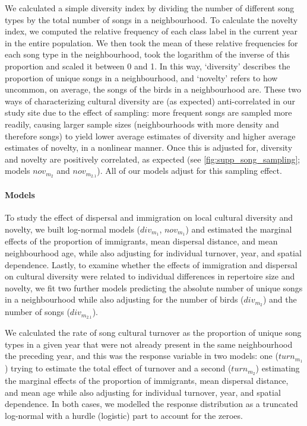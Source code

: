 We calculated a simple diversity index by dividing the number of different song types by the total number of songs in a neighbourhood. To calculate the novelty index, we computed the relative frequency of each class label in the current year in the entire population. We then took the mean of these relative frequencies for each song type in the neighbourhood, took the logarithm of the inverse of this proportion and scaled it between 0 and 1. In this way, ‘diversity' describes the proportion of unique songs in a neighbourhood, and ‘novelty' refers to how uncommon, on average, the songs of the birds in a neighbourhood are. These two ways of characterizing cultural diversity are (as expected) anti-correlated in our study site due to the effect of sampling: more frequent songs are sampled more readily, causing larger sample sizes (neighbourhoods with more density and therefore songs) to yield lower average estimates of diversity and higher average estimates of novelty, in a nonlinear manner. Once this is adjusted for, diversity and novelty are positively correlated, as expected (see \autoref{fig:supp_song_sampling}; models $nov_{m_2}$ and $nov_{m_{2.1}}$). All of our models adjust for this sampling effect.

\paragraph{Models}

To study the effect of dispersal and immigration on local cultural diversity and novelty, we built log-normal models ($div_{m_1}$, $nov_{m_1}$) and estimated the marginal effects of the proportion of immigrants, mean dispersal distance, and mean neighbourhood age, while also adjusting for individual turnover, year, and spatial dependence. Lastly, to examine whether the effects of immigration and dispersal on cultural diversity were related to individual differences in repertoire size and novelty, we fit two further models predicting the absolute number of unique songs in a neighbourhood while also adjusting for the number of birds ($div_{m_2}$) and the number of songs ($div_{m_{2.1}}$).

We calculated the rate of song cultural turnover as the proportion of unique song types in a given year that were not already present in the same neighbourhood the preceding year, and this was the response variable in two models: one ($turn_{m_1}$) trying to estimate the total effect of turnover and a second ($turn_{m_2}$) estimating the marginal effects of the proportion of immigrants, mean dispersal distance, and mean age while also adjusting for individual turnover, year, and spatial dependence. In both cases, we modelled the response distribution as a truncated log-normal with a hurdle (logistic) part to account for the zeroes. 



